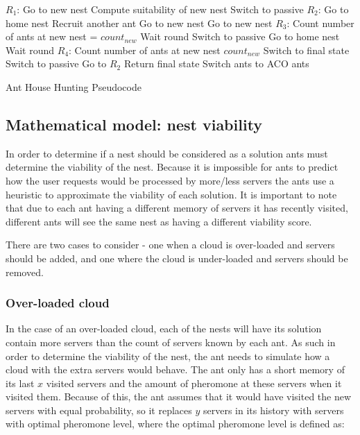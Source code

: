 \begin{algorithm}
\begin{algorithmic}
	\State $R_{1}$: Go to new nest
	\State Compute suitability of new nest
		Switch to passive
	\EndIf
	\State $R_{2}$: Go to home nest
		\State Recruit another ant
		\State Go to new nest
		\State Go to new nest
	\EndIf
	\State $R_{3}$: Count number of ants at new nest = $count_{new}$
		\State Wait round
		\State Switch to passive
		\State Go to home nest
		\State Wait round
	\EndIf
	\State $R_{4}$: Count number of ants at new nest $count_{new}$
		\State Switch to final state
		\State Switch to passive
		\State Go to $R_{2}$
	\EndIf
	\State Return final state
	\State Switch ants to ACO ants
\end{algorithmic}
\caption{Ant House Hunting Pseudocode}\label{ant:pseudocodeHouseHunting}
\end{algorithm}

\subsection{Mathematical model: nest viability}

In order to determine if a nest should be considered as a solution ants must determine the viability of the nest. Because it is impossible for ants to predict how the user requests would be processed by more/less servers the ants use a heuristic to approximate the viability of each solution. It is important to note that due to each ant having a different memory of servers it has recently visited, different ants will see the same nest as having a different viability score.

There are two cases to consider - one when a cloud is over-loaded and servers should be added, and one where the cloud is under-loaded and servers should be removed.

\subsubsection{Over-loaded cloud}

In the case of an over-loaded cloud, each of the nests will have its solution contain more servers than the count of servers known by each ant. As such in order to determine the viability of the nest, the ant needs to simulate how a cloud with the extra servers would behave. The ant only has a short memory of its last $x$ visited servers and the amount of pheromone at these servers when it visited them. Because of this, the ant assumes that it would have visited the new servers with equal probability, so it replaces $y$ servers in its history with servers with optimal pheromone level, where the optimal pheromone level is defined as:

